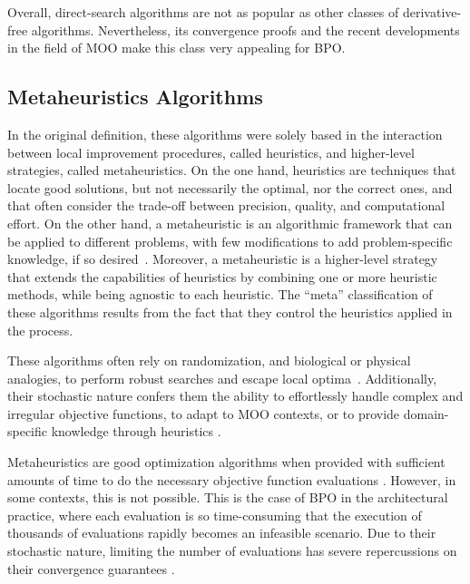 	Overall, direct-search algorithms are not as popular as other classes of derivative-free algorithms. Nevertheless, its convergence proofs and the recent developments in the field of \ac{MOO} make this class very appealing for \ac{BPO}. 
	
	\subsection{Metaheuristics Algorithms}
	\label{ssec:metaheuristics}
	In the original definition, these algorithms were solely based in the interaction between local improvement procedures, called heuristics, and higher-level strategies, called metaheuristics. On the one hand, heuristics are techniques that locate good solutions, but not necessarily the optimal, nor the correct ones, and that often consider the trade-off between precision, quality, and computational effort. On the other hand, a metaheuristic is an algorithmic framework that can be applied to different problems, with few modifications to add problem-specific knowledge, if so desired~\cite{Glover2003Metaheuristics}. Moreover, a metaheuristic is a higher-level strategy that extends the capabilities of heuristics by combining one or more heuristic methods, while being agnostic to each heuristic. The ``meta'' classification of these algorithms results from the fact that they control the heuristics applied in the process.
	
	These algorithms often rely on randomization, and biological or physical analogies, to perform robust searches and escape local optima~\cite{Glover2003Metaheuristics}. Additionally, their stochastic nature confers them the ability to effortlessly handle complex and irregular objective functions, to adapt to \ac{MOO} contexts, or to provide domain-specific knowledge through heuristics \cite{Wortmann2017GABESTCHOICE}.
	
	Metaheuristics are good optimization algorithms when provided with sufficient amounts of time to do the necessary objective function evaluations \cite{Conn2009}. However, in some contexts, this is not possible. This is the case of \ac{BPO} in the architectural practice, where each evaluation is so time-consuming that the execution of thousands of evaluations rapidly becomes an infeasible scenario. Due to their stochastic nature, limiting the number of evaluations has severe repercussions on their convergence guarantees \cite{Hasancebi2009}.
	
